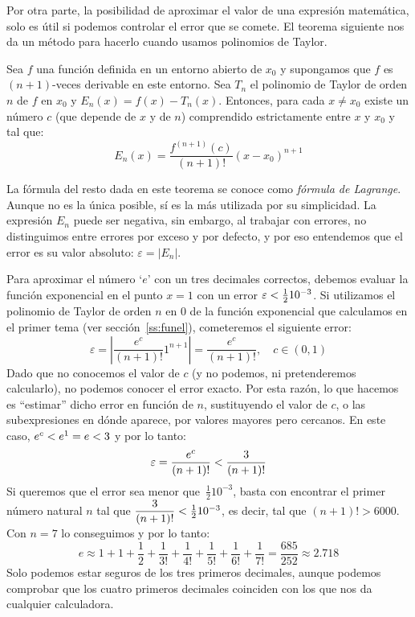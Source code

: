 Por otra parte, la posibilidad de aproximar el valor de una expresión matemática, solo es útil si podemos controlar el error que se comete. El teorema siguiente nos da un método para hacerlo cuando usamos polinomios de Taylor.
%
\begin{teorema}[de Lagrange] Sea $f$ una función definida en un entorno
abierto de $x_0$ y supongamos que $f$ es $(n+1)$-veces derivable en
este entorno. Sea $T_n$ el polinomio de Taylor de orden $n$ de $f$ en
$x_0$ y $E_n(x)=f(x)-T_n(x)$. Entonces, para cada $x\not=x_0$ existe un
número $c$ (que depende de $x$ y de $n$) comprendido estrictamente entre $x$
y $x_0$ y tal que:
\[
E_n(x)=\dfrac{f^{(n+1)}(c)}{(n+1)!}(x-x_0)^{n+1}
\]
\end{teorema}
%
La fórmula del resto dada en este teorema se conoce como \emph{fórmula de Lagrange}.
Aunque no es la única posible, sí es la más utilizada por su simplicidad.
La expresión $E_n$ puede ser negativa, sin embargo, al trabajar con errores, no distinguimos entre errores por exceso y por defecto, y por eso entendemos que el error es su valor absoluto: $\varepsilon = |E_n|$.
%
\begin{ejemplo}
Para aproximar el número `$e$' con un tres decimales correctos, debemos evaluar la función exponencial en el punto $x=1$ con un error $\varepsilon< \frac1210^{-3}$. Si utilizamos el polinomio de Taylor de orden $n$ en 0 de la función exponencial que calculamos en el primer tema (ver sección~\ref{ss:funel}), cometeremos el siguiente error:
\[
\varepsilon =\left|\dfrac{e^c}{(n+1)!}1^{n+1}\right| = \dfrac{e^c}{(n+1)!},\quad c\in(0,1)
\]
Dado que no conocemos el valor de $c$ (y no podemos, ni pretenderemos calcularlo), no podemos conocer el error exacto.
Por esta razón, lo que hacemos es ``estimar'' dicho error en función de $n$, sustituyendo el valor de $c$, o las subexpresiones en dónde aparece, por valores mayores pero cercanos.
En este caso, $e^c< e^1=e< 3$ y por lo tanto:
\[
\varepsilon = \dfrac{e^c}{(n+1)!} <  \dfrac{3}{(n+1)!}
\]
Si queremos que el error sea menor que~$\frac1210^{-3}$, basta con encontrar el primer número natural $n$ tal que $\dfrac{3}{(n+1)!}< \frac1210^{-3}$, es decir, tal que $(n+1)!>6000$. Con $n=7$ lo conseguimos y por lo tanto:
\[
e\approx 1+1+\frac{1}{2}+\frac{1}{3!}+\frac{1}{4!}+\frac{1}{5!}+\frac{1}{6!}+\frac{1}{7!}=\dfrac{685}{252}\approx2.718
\]
Solo podemos estar seguros de los tres primeros decimales, aunque podemos comprobar que los cuatro primeros decimales coinciden con los que nos da cualquier calculadora.\fej
\end{ejemplo}

